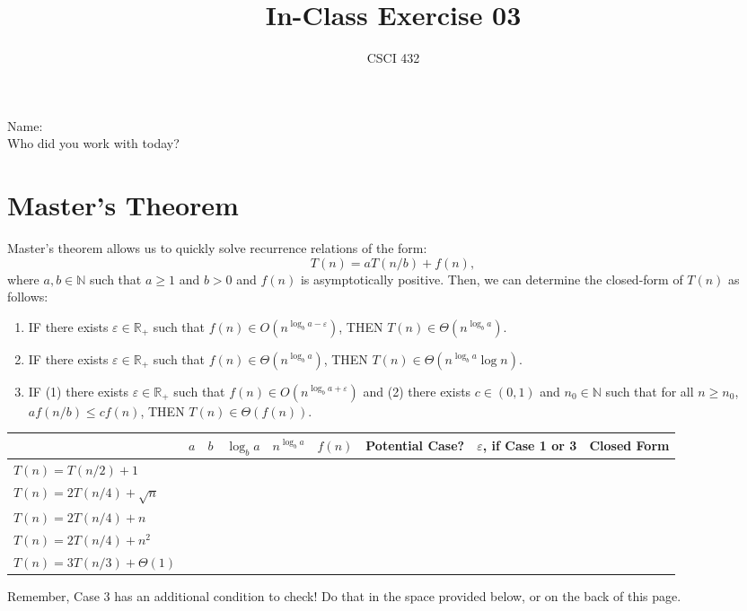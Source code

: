 \documentclass{article}
\title{In-Class Exercise 03}
\author{CSCI 432}
\def\R{{\mathbb R}}
\def\N{{\mathbb N}}
\begin{document}
\maketitle

\noindent
Name:\\
Who did you work with today?

\section*{Master's Theorem}

Master's theorem allows us to quickly solve recurrence relations of the form:
$$ T(n) = a T(n/b) + f(n),$$
where $a, b \in \N$ such that $a \geq 1$ and $b >0$ and $f(n)$ is asymptotically
positive.  Then, we can determine the closed-form of $T(n)$ as follows:
\begin{enumerate}
    \item IF there exists $\varepsilon \in \R_+$ such that $f(n) \in O(n^{\log_b
        a - \varepsilon})$, THEN $T(n) \in \Theta(n^{\log_b a})$.
    \item IF there exists $\varepsilon \in \R_+$ such that $f(n) \in \Theta(n^{\log_b
        a})$, THEN $T(n) \in \Theta(n^{\log_b a}\log n)$.
    \item IF (1) there exists $\varepsilon \in \R_+$ such that $f(n) \in O(n^{\log_b
        a + \varepsilon})$
        and (2) there exists $c \in (0,1)$ and $n_0 \in \N$ such that for all $n
        \geq n_0$, $a f(n/b) \leq c f(n)$, THEN $T(n) \in \Theta(f(n))$.
\end{enumerate}

\begin{table}[h!]
    \centering
    \begin{tabular}{|l|l|l|l|l|l|l|l|l|}
        \hline
        &  $a$ & $b$  & $\log_b a$  & $n^{\log_b a}$  & $f(n)$  & Potential
        Case? & $\varepsilon$, if Case 1 or 3  & Closed Form \\ \hline
        \hline
        $T(n) = T(n/2)+1$             & &  &  &  &  & & & \\[5ex] \hline
        $T(n) = 2 T(n/4) + \sqrt{n}$  & &  &  &  & &  & & \\[5ex] \hline
        $T(n) = 2 T(n/4) + n$         & &  &  &  &  & & &  \\[5ex] \hline
        $T(n) = 2 T(n/4) + n^2$       & &  &  &  &  & & & \\[5ex] \hline
        $T(n) = 3 T(n/3) + \Theta(1)$ & &  &  &  & & & & \\[5ex] \hline
    \end{tabular}
\end{table}
Remember, Case 3 has an additional condition to check! Do that in the space
provided below, or on the back of this page.\\
\fbox{\begin{minipage}{6.5in}\hfill\vspace{1in}\end{minipage}}
\end{document}
